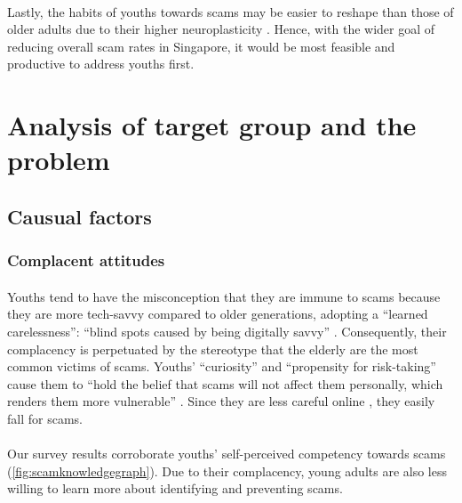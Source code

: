 \documentclass[a4paper]{article}
\begin{document}
\paragraph{} Lastly, the habits of youths towards scams may be easier to reshape
than those of older adults due to their higher neuroplasticity
\parencite{GoodTherapy.2019}. Hence, with the wider goal of reducing overall
scam rates in Singapore, it would be most feasible and productive to address
youths first.

\section{Analysis of target group and the problem}
\subsection{Causual factors}
\subsubsection{Complacent attitudes}
\paragraph{} Youths tend to have the misconception that they are immune to scams
because they are more tech-savvy compared to older generations, adopting a
``learned carelessness'': ``blind spots caused by being digitally savvy''
\parencite{Yuan.2023}. Consequently, their complacency is perpetuated by the
stereotype that the elderly are the most common victims of scams. Youths'
``curiosity'' and ``propensity for risk-taking'' cause them to ``hold the belief
that scams will not affect them personally, which renders them more vulnerable''
\parencite{Cheung.2023}. Since they are less careful online
\parencite{Carlson.2022}, they easily fall for scams.

\paragraph{} Our survey results corroborate youths' self-perceived competency
towards scams (\cref{fig:scamknowledgegraph}). Due to their complacency, young
adults are also less willing to learn more about identifying and preventing
scams.
\end{document}
